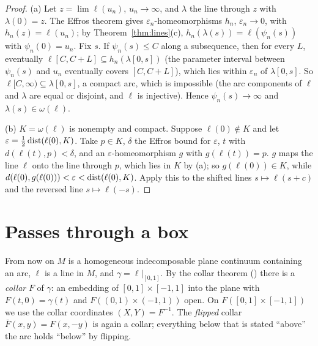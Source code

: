 \begin{proof}
(a) Let $z=\lim\ell(u_n)$, $u_n\to\infty$, and $\lambda$ the line through $z$ with $\lambda(0)=z$. The Effros theorem gives
$\varepsilon_n$-homeomorphisms $h_n$, $\varepsilon_n\to0$, with $h_n(z)=\ell(u_n)$; by Theorem~\ref{thm:lines}(c), $h_n(\lambda(s))=\ell(\psi_n(s))$
with $\psi_n(0)=u_n$. Fix $s$. If $\psi_n(s)\le C$ along a subsequence, then for every $L$, eventually $\ell[C,C+L]\subseteq h_n(\lambda[0,s])$ (the
parameter interval between $\psi_n(s)$ and $u_n$ eventually covers $[C,C+L]$), which lies within $\varepsilon_n$ of $\lambda[0,s]$. So
$\ell[C,\infty)\subseteq\lambda[0,s]$, a compact arc, which is impossible (the arc components of $\ell$ and $\lambda$ are equal or disjoint, and
$\ell$ is injective). Hence $\psi_n(s)\to\infty$ and $\lambda(s)\in\omega(\ell)$.

(b) $K=\omega(\ell)$ is nonempty and compact. Suppose $\ell(0)\notin K$ and let $\varepsilon=\frac12\operatorname{dist}(\ell(0),K)$. Take $p\in K$, $\delta$ the Effros
bound for $\varepsilon$, $t$ with $d(\ell(t),p)<\delta$, and an $\varepsilon$-homeomorphism $g$ with $g(\ell(t))=p$. $g$ maps the line $\ell$ onto the
line through $p$, which lies in $K$ by (a); so $g(\ell(0))\in K$, while $d(\ell(0),g(\ell(0)))<\varepsilon<\operatorname{dist}(\ell(0),K)$. Apply this to the shifted
lines $s\mapsto\ell(s+c)$ and the reversed line $s\mapsto\ell(-s)$.
\end{proof}


\section{Passes through a box}\label{sec:passes}

From now on $M$ is a homogeneous indecomposable plane continuum containing an arc, $\ell$ is a line in $M$, and
$\gamma=\ell|_{[0,1]}$. By the collar theorem () there is a \emph{collar} $F$ of $\gamma$: an embedding of
$[0,1]\times[-1,1]$ into the plane with $F(t,0)=\gamma(t)$ and $F((0,1)\times(-1,1))$ open. On $F([0,1]\times[-1,1])$ we use the collar coordinates
$(X,Y)=F^{-1}$. The \emph{flipped} collar $\bar F(x,y)=F(x,-y)$ is again a collar; everything below that is stated ``above'' the arc
holds ``below'' by flipping.


